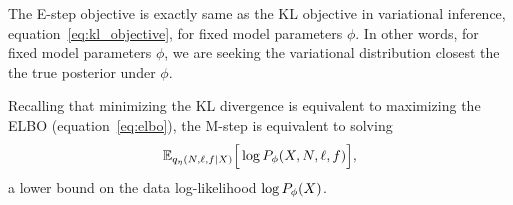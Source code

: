 The E-step objective is exactly same as the KL objective in variational inference, equation~\ref{eq:kl_objective}, for fixed model parameters $\phi$. 
In other words, for fixed model parameters $\phi$, we are seeking the variational distribution closest the the true posterior under $\phi$. 

Recalling that minimizing the KL divergence is equivalent to maximizing the ELBO (equation~\eqref{eq:elbo}), the M-step is equivalent to solving 
\begin{align}
    \mathbb{E}_{q_\eta(N, \ell, f | X)}\Big[\log P_\phi(X, N, \ell, f)\Big],
\end{align}
a lower bound on the data log-likelihood $\log P_\phi(X)$. 

%
%
